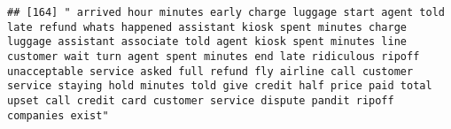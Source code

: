 \documentclass[
]{article}
\begin{document}
\begin{verbatim}
## [164] " arrived hour minutes early charge luggage start agent told late refund whats happened assistant kiosk spent minutes charge luggage assistant associate told agent kiosk spent minutes line customer wait turn agent spent minutes end late ridiculous ripoff unacceptable service asked full refund fly airline call customer service staying hold minutes told give credit half price paid total upset call credit card customer service dispute pandit ripoff companies exist"                                                                                                                                                                                                                                                                                                                                                                                                                                                                                                                                                                                                                                                                                                                                                                                                                                                                                                                                                                                                                                                                                                                                                                                                                                                                                                              

\end{verbatim}
\end{document}
